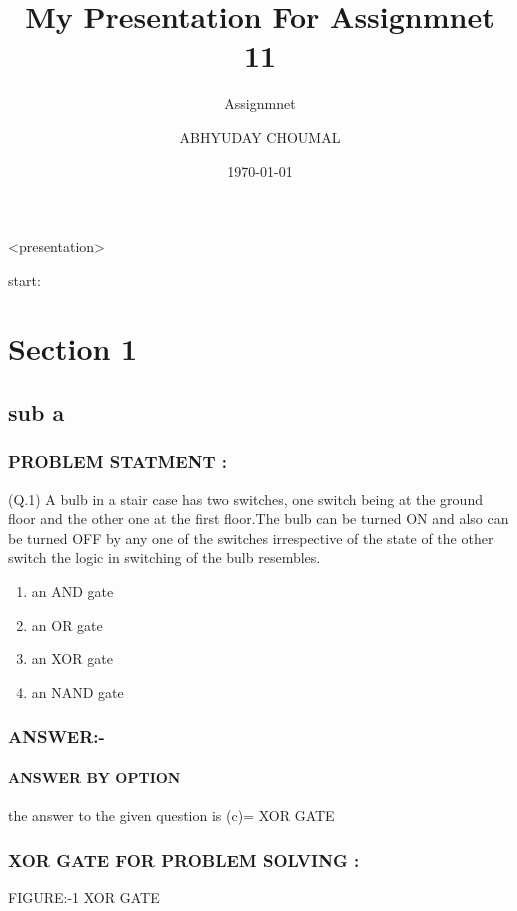 \documentclass{beamer}
\title{My Presentation For Assignmnet 11}
\subtitle{Assignmnet}
\author{ABHYUDAY CHOUMAL}
\institute{IIIT RAICHUR}
\date{\today}
\begin{document}
 <presentation>
 
 \titlepage start:


 
 \section{Section 1}
\subsection{sub a}

\begin{frame}
\frametitle{PROBLEM STATMENT :}
(Q.1)  
      A bulb in a stair case has two switches, one switch being at the ground floor and the other one at the first floor.The bulb can be turned ON and also can be turned OFF by any one of the switches irrespective of the state of the other switch the logic in switching of the bulb resembles.

\begin{enumerate}[label=(\Alph*)]
\item an AND gate
\item an OR gate
\item an XOR gate
\item an NAND gate
\end{enumerate}


\end{frame}
 
 \begin{frame}
\frametitle{ANSWER:-}
 \framesubtitle{ANSWER BY OPTION }
		the answer to the given question is (c)= XOR GATE
 
 \end{frame}
 
  \begin{frame}
\frametitle{XOR GATE FOR PROBLEM SOLVING :}
 
	    
	    
	    FIGURE:-1 XOR GATE
 
 
 \end{frame}
 
\end{document}
